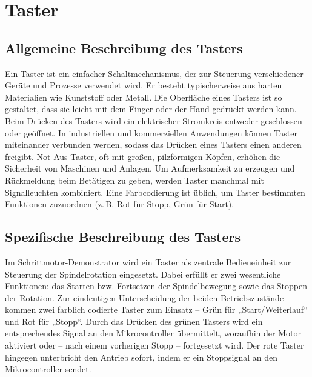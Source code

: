 %
%

\chapter{Taster}

\section{Allgemeine Beschreibung des Tasters}

Ein Taster ist ein einfacher Schaltmechanismus, der zur Steuerung verschiedener Geräte und Prozesse verwendet wird. Er besteht typischerweise aus harten Materialien wie Kunststoff oder Metall.
Die Oberfläche eines Tasters ist so gestaltet, dass sie leicht mit dem Finger oder der Hand gedrückt werden kann. Beim Drücken des Tasters wird ein elektrischer Stromkreis entweder geschlossen oder geöffnet.
In industriellen und kommerziellen Anwendungen können Taster miteinander verbunden werden, sodass das Drücken eines Tasters einen anderen freigibt. Not-Aus-Taster, oft mit großen, pilzförmigen Köpfen, erhöhen die Sicherheit von Maschinen und Anlagen. Um Aufmerksamkeit zu erzeugen und Rückmeldung beim Betätigen zu geben, werden Taster manchmal mit Signalleuchten kombiniert. Eine Farbcodierung ist üblich, um Taster bestimmten Funktionen zuzuordnen (z. B. Rot für Stopp, Grün für Start). 


\section{Spezifische Beschreibung des Tasters}

Im Schrittmotor-Demonstrator wird ein Taster als zentrale Bedieneinheit zur Steuerung der Spindelrotation eingesetzt. Dabei erfüllt er zwei wesentliche Funktionen: das Starten bzw. Fortsetzen der Spindelbewegung sowie das Stoppen der Rotation. Zur eindeutigen Unterscheidung der beiden Betriebszustände kommen zwei farblich codierte Taster zum Einsatz – Grün für „Start/Weiterlauf“ und Rot für „Stopp“.
Durch das Drücken des grünen Tasters wird ein entsprechendes Signal an den Mikrocontroller übermittelt, woraufhin der Motor aktiviert oder – nach einem vorherigen Stopp – fortgesetzt wird. Der rote Taster hingegen unterbricht den Antrieb sofort, indem er ein Stoppsignal an den Mikrocontroller sendet.


